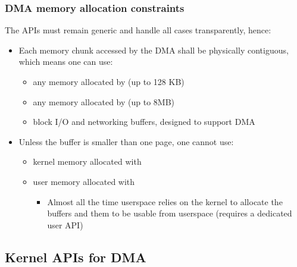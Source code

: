 \begin{frame}
  \frametitle{DMA memory allocation constraints}
  The APIs must remain generic and handle all cases transparently, hence:
  \begin{itemize}
  \item Each memory chunk accessed by the DMA shall be physically
    contiguous, which means one can use:
    \begin{itemize}
    \item any memory allocated by  (up to 128 KB)
    \item any memory allocated by  (up to 8MB)
    \item block I/O and networking buffers, designed to support DMA
    \end{itemize}
  \item Unless the buffer is smaller than one page, one cannot use:
    \begin{itemize}
    \item kernel memory allocated with 
    \item user memory allocated with 
      \begin{itemize}
      \item Almost all the time userspace relies on the kernel to allocate
        the buffers and  them to be usable from userspace
        (requires a dedicated user API)
      \end{itemize}
    \end{itemize}
  \end{itemize}
\end{frame}

\subsection{Kernel APIs for DMA}

